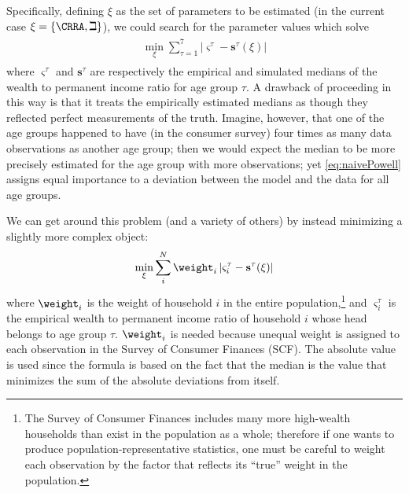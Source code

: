 \documentclass[titlepage, headings=optiontotocandhead]{Resources/texmf-local/tex/latex/econtex}
\begin{document}
Specifically, defining $\xi$ as the set of parameters
to be estimated (in the current case $\xi =\{\CRRA ,{\beth}\}$), we could search for
the parameter values which solve
  \begin{equation}
    \begin{gathered}
      \begin{aligned}
        \min_{\xi} \sum_{\tau=1}^{7} |\varsigma^{\tau} -\mathbf{s}^{\tau}(\xi)|  \label{eq:naivePowell}
      \end{aligned}
    \end{gathered}
  \end{equation}
where $\varsigma^{\tau }$ and $\mathbf{s}^{\tau}$ are respectively the empirical
and simulated medians of the wealth to permanent income ratio for age group $\tau$.
A drawback of proceeding in this way is that it treats the empirically
estimated medians as though they reflected perfect measurements of the
truth. Imagine, however, that one of the age groups happened to have
(in the consumer survey) four times as many data observations as
another age group; then we would expect the median to be more
precisely estimated for the age group with more observations; yet
\eqref{eq:naivePowell} assigns equal importance to a deviation between
the model and the data for all age groups.

We can get around this problem (and a variety of others) by instead minimizing a slightly more complex object:
  \begin{equation}
    \min_{\xi}\sum\limits_{i}^{N}\weight _{i}\left|\varsigma_{i}^{\tau }-\mathbf{s}^{\tau}(\xi )\right|\label{eq:StructEstim}
  \end{equation}
where $\weight_{i}$ is the weight of household $i$ in the entire
population,\footnote{The Survey of Consumer Finances includes many
  more high-wealth households than exist in the population as a whole;
  therefore if one wants to produce population-representative
  statistics, one must be careful to weight each observation by the
  factor that reflects its ``true'' weight in the population.} and
$\varsigma_{i}^{\tau }$ is the empirical wealth to permanent income
ratio of household $i$ whose head belongs to age group
$\tau$. $\weight _{i}$ is needed because unequal weight is assigned to
each observation in the Survey of Consumer Finances (SCF). The
absolute value is used since the formula is based on the fact that the
median is the value that minimizes the sum of the absolute deviations
from itself.

\end{document}
